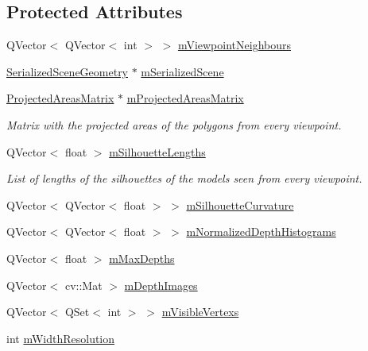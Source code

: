 \subsection*{Protected Attributes}
\begin{DoxyCompactItemize}
\item 
Q\+Vector$<$ Q\+Vector$<$ int $>$ $>$ \hyperlink{class_scene_information_builder_a5a53e68d2231c33310973f0dd5a9e551}{m\+Viewpoint\+Neighbours}
\item 
\hyperlink{class_serialized_scene_geometry}{Serialized\+Scene\+Geometry} $\ast$ \hyperlink{class_scene_information_builder_ae8d819fbab43ae3cd8300689117438d1}{m\+Serialized\+Scene}
\item 
\hyperlink{class_projected_areas_matrix}{Projected\+Areas\+Matrix} $\ast$ \hyperlink{class_scene_information_builder_a49c32356448cd956fd79a708cbef0fc6}{m\+Projected\+Areas\+Matrix}
\begin{DoxyCompactList}\small\item\em Matrix with the projected areas of the polygons from every viewpoint. \end{DoxyCompactList}\item 
Q\+Vector$<$ float $>$ \hyperlink{class_scene_information_builder_a1fb9eea608bb480a4e8aa7c29266707c}{m\+Silhouette\+Lengths}
\begin{DoxyCompactList}\small\item\em List of lengths of the silhouettes of the models seen from every viewpoint. \end{DoxyCompactList}\item 
Q\+Vector$<$ Q\+Vector$<$ float $>$ $>$ \hyperlink{class_scene_information_builder_a6a84bc0552ff09e02fda1c8020355768}{m\+Silhouette\+Curvature}
\item 
Q\+Vector$<$ Q\+Vector$<$ float $>$ $>$ \hyperlink{class_scene_information_builder_aedba13c498a101f8fae80040bc8e9343}{m\+Normalized\+Depth\+Histograms}
\item 
Q\+Vector$<$ float $>$ \hyperlink{class_scene_information_builder_a265522455bb4e8ac25a8f20954fb2739}{m\+Max\+Depths}
\item 
Q\+Vector$<$ cv\+::\+Mat $>$ \hyperlink{class_scene_information_builder_af0409338591797ebbc6d52ae7435c4d4}{m\+Depth\+Images}
\item 
Q\+Vector$<$ Q\+Set$<$ int $>$ $>$ \hyperlink{class_scene_information_builder_aed24f2301ec4a9297645d369ff5eaf60}{m\+Visible\+Vertexs}
\item 
int \hyperlink{class_scene_information_builder_a7406b48d40a381b62a49f02d60a5ed9d}{m\+Width\+Resolution}

\end{DoxyCompactItemize}
